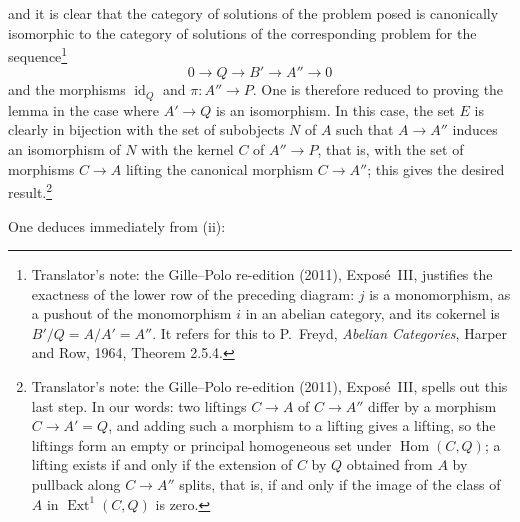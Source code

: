 and it is clear that the category of solutions of the problem posed is
canonically isomorphic to the category of solutions of the corresponding
problem for the sequence\footnote{Translator's note: the Gille--Polo re-edition (2011), Exposé~III, justifies the exactness of
the lower row of the preceding diagram: \(j\) is a monomorphism, as a pushout
of the monomorphism \(i\) in an abelian category, and its cokernel is
\(B'/Q=A/A'=A''\). It refers for this to P.~Freyd, \emph{Abelian
Categories}, Harper and Row, 1964, Theorem 2.5.4.}
\[
 0\longrightarrow Q\longrightarrow B'\longrightarrow A''\longrightarrow0
\]
and the morphisms \(\operatorname{id}_Q\) and \(\pi:A''\to P\). One is
therefore reduced to proving the lemma in the case where \(A'\to Q\) is an
isomorphism. In this case, the set \(E\) is clearly in bijection with the set
of subobjects \(N\) of \(A\) such that \(A\to A''\) induces an isomorphism of
\(N\) with the kernel \(C\) of \(A''\to P\), that is, with the set of
morphisms \(C\to A\) lifting the canonical morphism \(C\to A''\); this gives
the desired result.\footnote{Translator's note: the Gille--Polo re-edition (2011), Exposé~III, spells out this last step. In our
words: two liftings \(C\to A\) of \(C\to A''\) differ by a morphism
\(C\to A'=Q\), and adding such a morphism to a lifting gives a lifting, so
the liftings form an empty or principal homogeneous set under
\(\operatorname{Hom}(C,Q)\); a lifting exists if and only if the extension
of \(C\) by \(Q\) obtained from \(A\) by pullback along \(C\to A''\) splits,
that is, if and only if the image of the class of \(A\) in
\(\operatorname{Ext}^1(C,Q)\) is zero.}

One deduces immediately from (ii):


